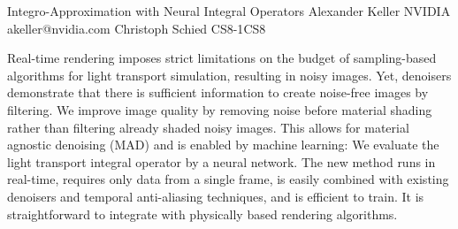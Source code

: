 \begin{talk}
  {Integro-Approximation with Neural Integral Operators}%
  {Alexander Keller}%
  {NVIDIA}%
  {akeller@nvidia.com}%
  {Christoph Schied}%
{}{}{CS8-1}{CS8}


Real-time rendering imposes strict limitations on the budget of
sampling-based algorithms for light transport simulation, resulting in
noisy images. Yet, denoisers demonstrate that there is sufficient information to create
noise-free images by filtering. We improve image quality by
removing noise before material shading rather than filtering already shaded noisy images. This allows for
material agnostic denoising (MAD) and is enabled by machine learning:
We
evaluate the light transport integral operator by a neural network.
The new method runs in real-time, requires only data from a single frame,
is easily combined with existing denoisers and temporal anti-aliasing
techniques, and is efficient to train. It is straightforward to integrate with
physically based rendering algorithms.
\end{talk}

